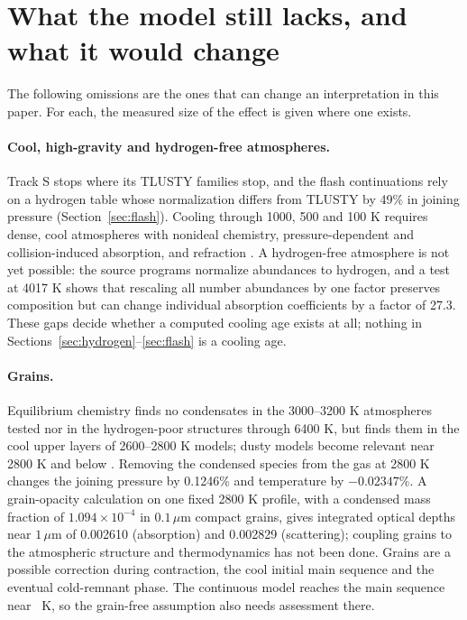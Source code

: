 \section{What the model still lacks, and what it would change}\label{sec:limits}
The following omissions are the ones that can change an interpretation in
this paper. For each, the measured size of the effect is given where one
exists.

\paragraph{Cool, high-gravity and hydrogen-free atmospheres.}
Track S stops where its TLUSTY families stop, and the flash continuations
rely on a hydrogen table whose normalization differs from TLUSTY by 49\% in
joining pressure (Section~\ref{sec:flash}). Cooling through 1000, 500 and
100 K requires dense, cool atmospheres with nonideal chemistry,
pressure-dependent and collision-induced absorption, and refraction
\cite{blouin18}. A hydrogen-free atmosphere is not yet possible: the source
programs normalize abundances to hydrogen, and a test at 4017 K shows that
rescaling all number abundances by one factor preserves composition but can
change individual absorption coefficients by a factor of 27.3. These gaps
decide whether a computed cooling age exists at all; nothing in
Sections~\ref{sec:hydrogen}--\ref{sec:flash} is a cooling age.

\paragraph{Grains.}
Equilibrium chemistry finds no condensates in the 3000--3200 K atmospheres
tested nor in the hydrogen-poor structures through 6400 K, but finds them in
the cool upper layers of 2600--2800 K models; dusty models become relevant
near 2800 K and below \cite{chabrier00}. Removing the condensed species from
the gas at 2800 K changes the joining pressure by 0.1246\% and temperature by
$-0.02347\%$. A grain-opacity calculation on one fixed 2800 K profile, with
a condensed mass fraction of $1.094\times10^{-4}$ in $0.1\,\mu$m compact
grains, gives integrated optical depths near $1\,\mu$m of 0.002610
(absorption) and 0.002829 (scattering); coupling grains to the atmospheric
structure and thermodynamics has not been done. Grains are a possible
correction during contraction, the cool initial main sequence and the
eventual cold-remnant phase. The continuous model reaches the main sequence
near \pmsTemperature\ K, so the grain-free assumption also needs assessment there.

